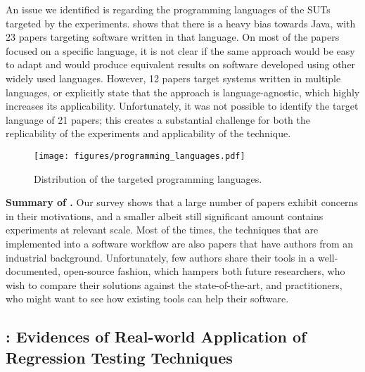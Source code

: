An issue we identified is regarding the programming languages of the SUTs targeted by the experiments.
 shows that there is a heavy bias towards Java, with 23 papers targeting software written in that language.
On most of the papers focused on a specific language, it is not clear if the same approach would be easy to adapt and would produce equivalent results on software developed using other widely used languages.
However, 12 papers target systems written in multiple languages, or explicitly state that the approach is language-agnostic, which highly increases its applicability.
Unfortunately, it was not possible to identify the target language of 21 papers; this creates a substantial challenge for both the replicability of the experiments and applicability of the technique.


\begin{figure}
  \center
  \texttt{[image: figures/programming\_languages.pdf]}
  \caption{Distribution of the targeted programming languages.}
  \label{fig:programming_languages}
\end{figure}


\begin{tcolorbox}%
\textbf{Summary of .}
Our survey shows that a large number of papers exhibit \rea concerns in their motivations, and a smaller albeit still significant amount contains experiments at relevant scale. 
Most of the times, the techniques that are implemented into a software workflow are also papers that have authors from an industrial background. %
Unfortunately, few authors share their tools in a well-documented, open-source fashion, which hampers both future researchers, who wish to compare their solutions against the state-of-the-art, and practitioners, who might want to see how existing \rt tools can help their software.
\end{tcolorbox}






\subsection{: Evidences of Real-world Application of Regression Testing Techniques}
\label{sec:lit_rq3}

